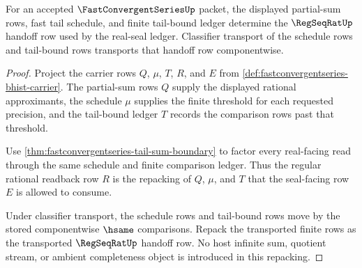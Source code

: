 \begin{theorem}
\label{thm:fastconvergentseries-regseqrat-tail-bound-obligations}
For an accepted $\FastConvergentSeriesUp$ packet, the displayed partial-sum rows, fast tail schedule, and finite tail-bound ledger determine the $\RegSeqRatUp$ handoff row used by the real-seal ledger. Classifier transport of the schedule rows and tail-bound rows transports that handoff row componentwise.
\end{theorem}
\begin{proof}
Project the carrier rows $Q$, $\mu$, $T$, $R$, and $E$ from \autoref{def:fastconvergentseries-bhist-carrier}. The partial-sum rows $Q$ supply the displayed rational approximants, the schedule $\mu$ supplies the finite threshold for each requested precision, and the tail-bound ledger $T$ records the comparison rows past that threshold.

Use \autoref{thm:fastconvergentseries-tail-sum-boundary} to factor every real-facing read through the same schedule and finite comparison ledger. Thus the regular rational readback row $R$ is the repacking of $Q$, $\mu$, and $T$ that the seal-facing row $E$ is allowed to consume.

Under classifier transport, the schedule rows and tail-bound rows move by the stored componentwise $\hsame$ comparisons. Repack the transported finite rows as the transported $\RegSeqRatUp$ handoff row. No host infinite sum, quotient stream, or ambient completeness object is introduced in this repacking.
\end{proof}

